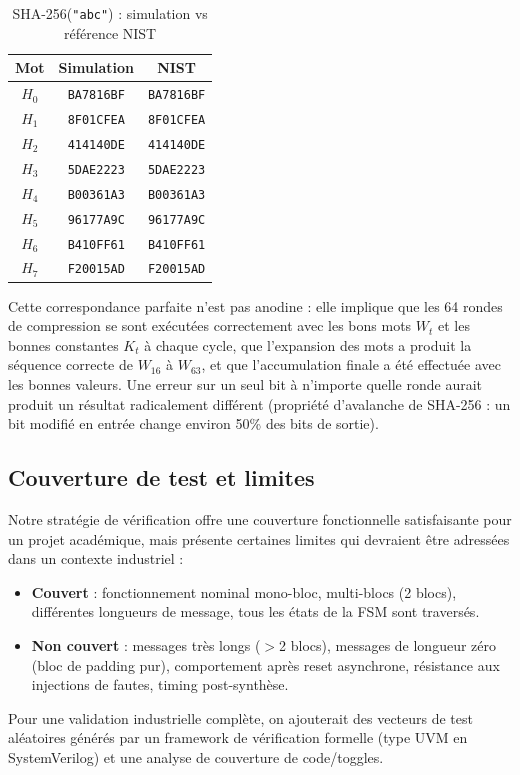 \begin{table}[H]
\centering
\caption{SHA-256(\texttt{"abc"}) : simulation vs référence NIST}
\label{tab:digests}
\begin{tabular}{ccc}
\toprule
\textbf{Mot} & \textbf{Simulation} & \textbf{NIST} \\
\midrule
$H_0$ & \texttt{BA7816BF} & \texttt{BA7816BF} \\
$H_1$ & \texttt{8F01CFEA} & \texttt{8F01CFEA} \\
$H_2$ & \texttt{414140DE} & \texttt{414140DE} \\
$H_3$ & \texttt{5DAE2223} & \texttt{5DAE2223} \\
$H_4$ & \texttt{B00361A3} & \texttt{B00361A3} \\
$H_5$ & \texttt{96177A9C} & \texttt{96177A9C} \\
$H_6$ & \texttt{B410FF61} & \texttt{B410FF61} \\
$H_7$ & \texttt{F20015AD} & \texttt{F20015AD} \\
\bottomrule
\end{tabular}
\end{table}

Cette correspondance parfaite n'est pas anodine : elle implique que les 64 rondes de compression se sont exécutées correctement avec les bons mots $W_t$ et les bonnes constantes $K_t$ à chaque cycle, que l'expansion des mots a produit la séquence correcte de $W_{16}$ à $W_{63}$, et que l'accumulation finale a été effectuée avec les bonnes valeurs. Une erreur sur un seul bit à n'importe quelle ronde aurait produit un résultat radicalement différent (propriété d'avalanche de SHA-256 : un bit modifié en entrée change environ 50\% des bits de sortie).

\subsection{Couverture de test et limites}

Notre stratégie de vérification offre une couverture fonctionnelle satisfaisante pour un projet académique, mais présente certaines limites qui devraient être adressées dans un contexte industriel :

\begin{itemize}
    \item \textbf{Couvert} : fonctionnement nominal mono-bloc, multi-blocs (2 blocs), différentes longueurs de message, tous les états de la FSM sont traversés.
    \item \textbf{Non couvert} : messages très longs ($>$2 blocs), messages de longueur zéro (bloc de padding pur), comportement après reset asynchrone, résistance aux injections de fautes, timing post-synthèse.
\end{itemize}

Pour une validation industrielle complète, on ajouterait des vecteurs de test aléatoires générés par un framework de vérification formelle (type UVM en SystemVerilog) et une analyse de couverture de code/toggles.

